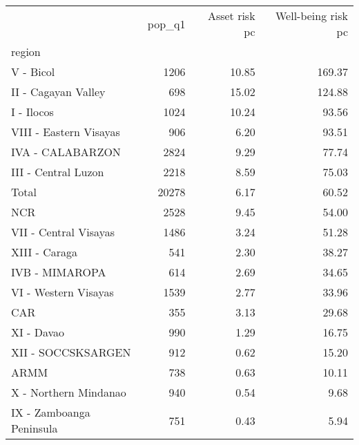 \begin{tabular}{lrrr}
\toprule
{} &  pop\_q1 &  Asset risk pc &  Well-being risk pc \\
region                   &         &                &                     \\
\midrule
V - Bicol                &    1206 &          10.85 &              169.37 \\
II - Cagayan Valley      &     698 &          15.02 &              124.88 \\
I - Ilocos               &    1024 &          10.24 &               93.56 \\
VIII - Eastern Visayas   &     906 &           6.20 &               93.51 \\
IVA - CALABARZON         &    2824 &           9.29 &               77.74 \\
III - Central Luzon      &    2218 &           8.59 &               75.03 \\
Total                    &   20278 &           6.17 &               60.52 \\
NCR                      &    2528 &           9.45 &               54.00 \\
VII - Central Visayas    &    1486 &           3.24 &               51.28 \\
XIII - Caraga            &     541 &           2.30 &               38.27 \\
IVB - MIMAROPA           &     614 &           2.69 &               34.65 \\
VI - Western Visayas     &    1539 &           2.77 &               33.96 \\
CAR                      &     355 &           3.13 &               29.68 \\
XI - Davao               &     990 &           1.29 &               16.75 \\
XII - SOCCSKSARGEN       &     912 &           0.62 &               15.20 \\
ARMM                     &     738 &           0.63 &               10.11 \\
X - Northern Mindanao    &     940 &           0.54 &                9.68 \\
IX - Zamboanga Peninsula &     751 &           0.43 &                5.94 \\
\bottomrule
\end{tabular}
